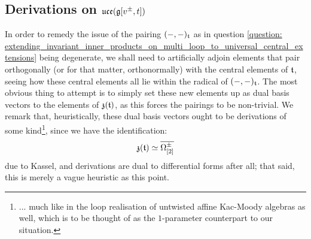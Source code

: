         \subsection{Derivations on \texorpdfstring{$ \mathfrak{uce}(\mathfrak{g}[v^{\pm}, t]) $}{}}
            \begin{remark} \label{remark: extending_toroidal_lie_algebras_by_derivations}
                In order to remedy the issue of the pairing $(-, -)_{\mathfrak{t}}$ as in question \ref{question: extending_invariant_inner_products_on_multi_loop_to_universal_central_extensions} being degenerate, we shall need to artificially adjoin elements that pair orthogonally (or for that matter, orthonormally) with the central elements of $\mathfrak{t}$, seeing how these central elements all lie within the radical of $(-, -)_{\mathfrak{t}}$. The most obvious thing to attempt is to simply set these new elements up as dual basis vectors to the elements of $\mathfrak{z}(\mathfrak{t})$, as this forces the pairings to be non-trivial. We remark that, heuristically, these dual basis vectors ought to be derivations of some kind\footnote{... much like in the loop realisation of untwisted affine Kac-Moody algebras as well, which is to be thought of as the $1$-parameter counterpart to our situation.}, since we have the identification:
                    $$\mathfrak{z}(\mathfrak{t}) \simeq \overline{\Omega^{\pm}_{[2]}}$$
                due to Kassel, and derivations are dual to differential forms after all; that said, this is merely a vague heuristic as this point.


\end{remark}
